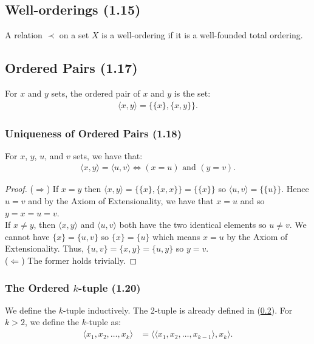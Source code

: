 \subsection{Well-orderings (1.15)} \label{1.15}

A relation $\prec$ on a set $X$ is a well-ordering if it is a
well-founded total ordering.

\subsection{Ordered Pairs (1.17)} \label{1.17}

For $x$ and $y$ sets, the ordered pair of $x$ and $y$ is the set: \begin{align*}
    \langle x, y \rangle = \{\{x\}, \{x, y\}\}.
\end{align*}

\subsubsection{Uniqueness of Ordered Pairs (1.18)} \label{1.18}

For $x$, $y$, $u$, and $v$ sets, we have that: \begin{align*}
    \langle x, y \rangle = \langle u, v \rangle 
    \Longleftrightarrow
    (x = u) \text{ and } (y = v).
\end{align*}

\begin{proof}
    ($\Longrightarrow$) If $x = y$ then 
    $\langle x, y \rangle = \{\{x\}, \{x, x\}\} = \{\{x\}\}$ so 
    $\langle u, v \rangle = \{\{u\}\}$. Hence $u = v$ and
    by the Axiom of Extensionality, we have that $x = u$ and so $y = x = u = v$.
    \\[\baselineskip]
    If $x \neq y$, then $\langle x, y \rangle$ and $\langle u, v \rangle$
    both have the two identical elements so $u \neq v$.
    We cannot have $\{x\} = \{u, v\}$ so $\{x\} = \{u\}$ which means
    $x = u$ by the Axiom of Extensionality. Thus, 
    $\{u, v\} = \{x, y\} = \{u, y\}$ so $y = v$.
    \\[\baselineskip]
    ($\Longleftarrow$) The former holds trivially.
\end{proof}

\subsubsection{The Ordered $k$-tuple (1.20)} \label{1.20}

We define the $k$-tuple inductively. The 2-tuple is already defined in (\ref{1.17}).
For $k > 2$, we define the $k$-tuple as: \begin{align*}
    \langle x_1, x_2, \ldots, x_k \rangle &= \langle \langle x_1, x_2, \ldots, x_{k - 1} \rangle, x_k \rangle.
\end{align*}

